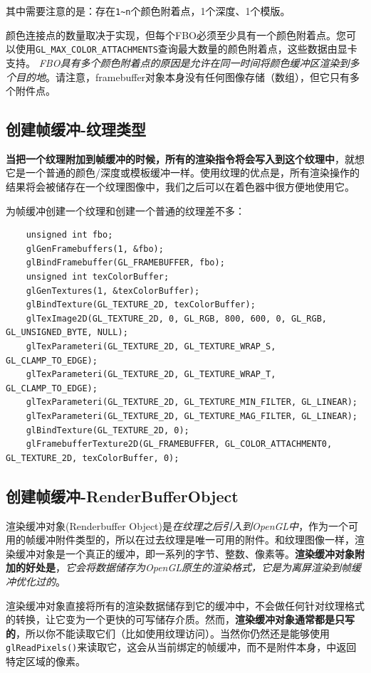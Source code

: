 \documentclass[UTF8,a4paper,12pt]{ctexbook}
\begin{document}
		其中需要注意的是：存在\verb|1~n|个颜色附着点，1个深度、1个模版。
		
		颜色连接点的数量取决于实现，但每个FBO必须至少具有一个颜色附着点。您可以使用\verb|GL_MAX_COLOR_ATTACHMENTS|查询最大数量的颜色附着点，这些数据由显卡支持。 \textit{FBO具有多个颜色附着点的原因是允许在同一时间将颜色缓冲区渲染到多个目的地}。请注意，framebuffer对象本身没有任何图像存储（数组），但它只有多个附件点。
		
		\subsection{创建帧缓冲-纹理类型}
			\textbf{当把一个纹理附加到帧缓冲的时候，所有的渲染指令将会写入到这个纹理中}，就想它是一个普通的颜色/深度或模板缓冲一样。使用纹理的优点是，所有渲染操作的结果将会被储存在一个纹理图像中，我们之后可以在着色器中很方便地使用它。
			
			为帧缓冲创建一个纹理和创建一个普通的纹理差不多：
			\begin{lstlisting}
	unsigned int fbo;
	glGenFramebuffers(1, &fbo);
	glBindFramebuffer(GL_FRAMEBUFFER, fbo);
	unsigned int texColorBuffer;
	glGenTextures(1, &texColorBuffer);
	glBindTexture(GL_TEXTURE_2D, texColorBuffer);
	glTexImage2D(GL_TEXTURE_2D, 0, GL_RGB, 800, 600, 0, GL_RGB, GL_UNSIGNED_BYTE, NULL);
	glTexParameteri(GL_TEXTURE_2D, GL_TEXTURE_WRAP_S, GL_CLAMP_TO_EDGE);
	glTexParameteri(GL_TEXTURE_2D, GL_TEXTURE_WRAP_T, GL_CLAMP_TO_EDGE);
	glTexParameteri(GL_TEXTURE_2D, GL_TEXTURE_MIN_FILTER, GL_LINEAR);
	glTexParameteri(GL_TEXTURE_2D, GL_TEXTURE_MAG_FILTER, GL_LINEAR);
	glBindTexture(GL_TEXTURE_2D, 0);
	glFramebufferTexture2D(GL_FRAMEBUFFER, GL_COLOR_ATTACHMENT0, GL_TEXTURE_2D, texColorBuffer, 0);			
			\end{lstlisting}
		
		\subsection{创建帧缓冲-RenderBufferObject}
			渲染缓冲对象(Renderbuffer Object)是\textit{在纹理之后引入到OpenGL中}，作为一个可用的帧缓冲附件类型的，所以在过去纹理是唯一可用的附件。和纹理图像一样，渲染缓冲对象是一个真正的缓冲，即一系列的字节、整数、像素等。\textbf{渲染缓冲对象附加的好处是}，\textit{它会将数据储存为OpenGL原生的渲染格式，它是为离屏渲染到帧缓冲优化过的}。
			
			渲染缓冲对象直接将所有的渲染数据储存到它的缓冲中，不会做任何针对纹理格式的转换，让它变为一个更快的可写储存介质。然而，\textbf{渲染缓冲对象通常都是只写的}，所以你不能读取它们（比如使用纹理访问）。当然你仍然还是能够使用\verb|glReadPixels()|来读取它，这会从当前绑定的帧缓冲，而不是附件本身，中返回特定区域的像素。
			
\end{document}
